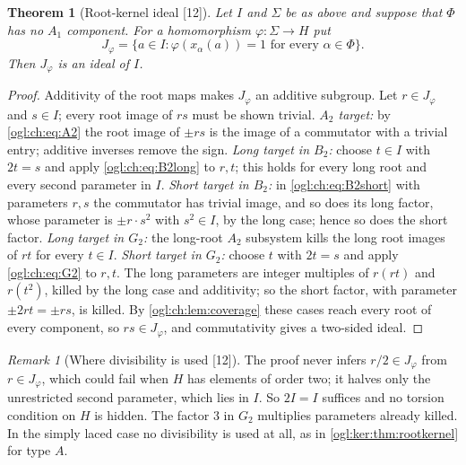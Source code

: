 \documentclass[11pt,oneside]{article}
\numberwithin{equation}{section}
\newtheorem{theorem}{Theorem}[section]
\theoremstyle{definition}
\theoremstyle{remark}
\newtheorem{remark}[remark]{Remark}
\newcommand{\src}[1]{\textup{\textsf{\small[#1]}}}
\begin{document}
\begin{theorem}[Root-kernel ideal \src{12}]\label{ogl:ch:thm:rootideal}
Let $I$ and $\Sigma$ be as above and suppose that $\Phi$ has no $A_1$ component.
For a homomorphism $\varphi:\Sigma\to H$ put
\[
 J_\varphi=\{a\in I:\varphi(x_\alpha(a))=1\text{ for every }\alpha\in\Phi\}.
\]
Then $J_\varphi$ is an ideal of $I$.
\end{theorem}
\begin{proof}
Additivity of the root maps makes $J_\varphi$ an additive subgroup. Let
$r\in J_\varphi$ and $s\in I$; every root image of $rs$ must be shown trivial.
\emph{$A_2$ target:} by \eqref{ogl:ch:eq:A2} the root image of $\pm rs$ is the
image of a commutator with a trivial entry; additive inverses remove the sign.
\emph{Long target in $B_2$:} choose $t\in I$ with $2t=s$ and apply
\eqref{ogl:ch:eq:B2long} to $r,t$; this holds for every long root and every
second parameter in $I$.
\emph{Short target in $B_2$:} in \eqref{ogl:ch:eq:B2short} with parameters
$r,s$ the commutator has trivial image, and so does its long factor, whose
parameter is $\pm r\cdot s^2$ with $s^2\in I$, by the long case; hence so does
the short factor.
\emph{Long target in $G_2$:} the long-root $A_2$ subsystem kills the long root
images of $rt$ for every $t\in I$.
\emph{Short target in $G_2$:} choose $t$ with $2t=s$ and apply
\eqref{ogl:ch:eq:G2} to $r,t$. The long parameters are integer multiples of
$r(rt)$ and $r(t^2)$, killed by the long case and additivity; so the short
factor, with parameter $\pm2rt=\pm rs$, is killed.
By \cref{ogl:ch:lem:coverage} these cases reach every root of every component,
so $rs\in J_\varphi$, and commutativity gives a two-sided ideal.
\end{proof}

\begin{remark}[Where divisibility is used \src{12}]\label{ogl:ch:rem:half}
The proof never infers $r/2\in J_\varphi$ from $r\in J_\varphi$, which could fail
when $H$ has elements of order two; it halves only the unrestricted second
parameter, which lies in $I$. So $2I=I$ suffices and no torsion condition on $H$
is hidden. The factor $3$ in $G_2$ multiplies parameters already killed. In the
simply laced case no divisibility is used at all, as in
\cref{ogl:ker:thm:rootkernel} for type $A$.
\end{remark}
\end{document}
